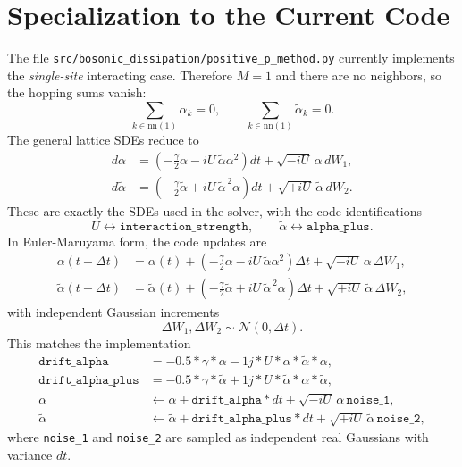 \documentclass[12pt]{article}
\begin{document}
\section*{Specialization to the Current Code}
The file \texttt{src/bosonic\_dissipation/positive\_p\_method.py} currently implements the \emph{single-site} interacting case. Therefore $M=1$ and there are no neighbors, so the hopping sums vanish:
\[
\sum_{k\in \mathrm{nn}(1)} \alpha_k = 0,
\qquad
\sum_{k\in \mathrm{nn}(1)} \widetilde{\alpha}_k = 0.
\]
The general lattice SDEs reduce to
\begin{align}
d\alpha
&=
\left(
-\frac{\gamma}{2}\alpha
-iU\,\widetilde{\alpha}\alpha^2
\right)dt
+ \sqrt{-iU}\,\alpha\,dW_1, \\
d\widetilde{\alpha}
&=
\left(
-\frac{\gamma}{2}\widetilde{\alpha}
+iU\,\widetilde{\alpha}^{\,2}\alpha
\right)dt
+ \sqrt{+iU}\,\widetilde{\alpha}\,dW_2.
\end{align}
These are exactly the SDEs used in the solver, with the code identifications
\[
U \leftrightarrow \texttt{interaction\_strength},
\qquad
\widetilde{\alpha} \leftrightarrow \texttt{alpha\_plus}.
\]
In Euler-Maruyama form, the code updates are
\begin{align}
\alpha(t+\Delta t)
&=
\alpha(t)
+
\left(
-\frac{\gamma}{2}\alpha
-iU\,\widetilde{\alpha}\alpha^2
\right)\Delta t
+ \sqrt{-iU}\,\alpha\,\Delta W_1, \\
\widetilde{\alpha}(t+\Delta t)
&=
\widetilde{\alpha}(t)
+
\left(
-\frac{\gamma}{2}\widetilde{\alpha}
+iU\,\widetilde{\alpha}^{\,2}\alpha
\right)\Delta t
+ \sqrt{+iU}\,\widetilde{\alpha}\,\Delta W_2,
\end{align}
with independent Gaussian increments
\[
\Delta W_1,\Delta W_2 \sim \mathcal{N}(0,\Delta t).
\]
This matches the implementation
\begin{align*}
\texttt{drift\_alpha} &= -0.5 * \gamma * \alpha - 1j * U * \alpha * \widetilde{\alpha} * \alpha, \\
\texttt{drift\_alpha\_plus} &= -0.5 * \gamma * \widetilde{\alpha} + 1j * U * \widetilde{\alpha} * \alpha * \widetilde{\alpha}, \\
\alpha &\leftarrow \alpha + \texttt{drift\_alpha} * dt + \sqrt{-iU}\,\alpha\,\texttt{noise\_1}, \\
\widetilde{\alpha} &\leftarrow \widetilde{\alpha} + \texttt{drift\_alpha\_plus} * dt + \sqrt{+iU}\,\widetilde{\alpha}\,\texttt{noise\_2},
\end{align*}
where \texttt{noise\_1} and \texttt{noise\_2} are sampled as independent real Gaussians with variance $dt$.
\end{document}
